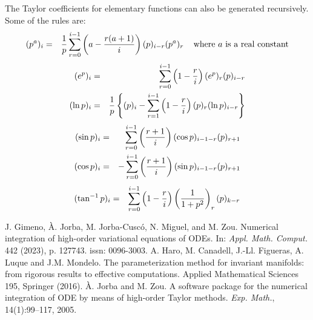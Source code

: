 \documentclass[10pt]{article}
\theoremstyle{remark}
\begin{document}
The Taylor coefficients for elementary functions can also be generated
recursively. Some of the rules are:
\begin{eqnarray*}
(p^a)_i &=& {1 \over p} \sum_{r=0}^{i-1}\left(
a - { {r(a+1)\over i}}\right)(p)_{i-r}(p^a)_r\;\;\; \mbox{
where $a$ is a real constant} 
\end{eqnarray*}
\begin{eqnarray*}
(e^p)_i &=& \sum_{r=0}^{i-1} \left(1-{r\over i}\right)
(e^p)_r (p)_{i-r}\cr
(\ln p)_i &=& {1\over {p}} \left\{ (p)_i - \sum_{r=1}^{i-1}
\left(1 - {r\over i}\right)(p)_r(\ln p)_{i-r}\right\}
\end{eqnarray*}
\begin{eqnarray*}
(\sin p)_i &=& \sum_{r=0}^{i-1}\left({{r+1}\over
i}\right)(\cos p)_{i-1-r} (p)_{r+1}\cr
(\cos p)_i &=& -\sum_{r=0}^{i-1}\left({{r+1}\over
i}\right)(\sin p)_{i-1-r} (p)_{r+1}\cr
\end{eqnarray*}
\begin{eqnarray*}
(\tan^{-1} p)_i &=& \sum_{r=0}^{i-1}\left(1 - {r\over i}\right)
\left( {1 \over {1+p^2}}\right)_r (p)_{k-r}
\end{eqnarray*}



\begin{thebibliography}{9}
 J. Gimeno, \`A. Jorba, M. Jorba-Cusc\'o, N. Miguel,
  and M. Zou. Numerical integration of high-order variational
  equations of ODEs. In: {\it Appl. Math. Comput.} 442 (2023),
  p. 127743. {\sc issn}: 0096-3003.
 A. Haro, M. Canadell, J.-Ll. Figueras, A. Luque
  and J.M. Mondelo. The parameterization method for invariant manifolds:
  from rigorous results to effective computations.
  Applied Mathematical Sciences 195, Springer (2016).
 \`A. Jorba and M. Zou. A software package for the
  numerical integration of ODE by means of high-order Taylor
  methods. {\it Exp. Math.}, 14(1):99–117, 2005.
\end{thebibliography}
\end{document}
